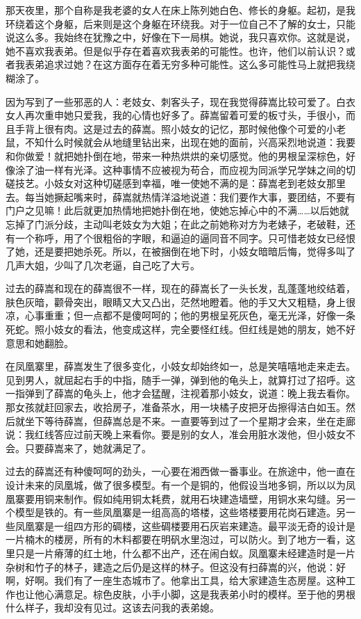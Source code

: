 那天夜里，那个自称是我老婆的女人在床上陈列她白色、修长的身躯。起初，是我环绕着这个身躯，后来则是这个身躯在环绕我。对于一位自己不了解的女士，只能说这么多。我始终在犹豫之中，好像在下一局棋。她说，我只喜欢你。这就是说，她不喜欢我表弟。但是似乎存在着喜欢我表弟的可能性。也许，他们以前认识？或者我表弟追求过她？在这方面存在着无穷多种可能性。这么多可能性马上就把我绕糊涂了。 

因为写到了一些邪恶的人：老妓女、刺客头子，现在我觉得薛嵩比较可爱了。白衣女人再次重申她只爱我，我的心情也好多了。薛嵩留着可爱的板寸头，手很小，而且手背上很有肉。这是过去的薛嵩。照小妓女的记忆，那时候他像个可爱的小老鼠，不知什么时候就会从地缝里钻出来，出现在她的面前，兴高采烈地说道：我要和你做爱！就把她扑倒在地，带来一种热烘烘的亲切感觉。他的男根呈深棕色，好像涂了油一样有光泽。这种事情不应被视为苟合，而应视为同派学兄学妹之间的切磋技艺。小妓女对这种切磋感到幸福，唯一使她不满的是：薛嵩老到老妓女那里去。每当她撅起嘴来时，薛嵩就热情洋溢地说道：我们要作大事，要团结，不要有门户之见嘛！此后就更加热情地把她扑倒在地，使她忘掉心中的不满……以后她就忘掉了门派分歧，主动叫老妓女为大姐；在此之前她称对方为老婊子，老破鞋，还有一个称呼，用了个很粗俗的字眼，和逼迫的逼同音不同字。只可惜老妓女已经恨了她，还是要把她杀死。所以，在被捆倒在地下时，小妓女暗暗后悔，觉得多叫了几声大姐，少叫了几次老逼，自己吃了大亏。 

过去的薛嵩和现在的薛嵩很不一样，现在的薛嵩长了一头长发，乱蓬蓬地绞结着，肤色灰暗，颧骨突出，眼睛又大又凸出，茫然地瞪着。他的手又大又粗糙，身上很凉，心事重重；但一点都不是傻呵呵的；他的男根呈死灰色，毫无光泽，好像一条死蛇。照小妓女的看法，他变成这样，完全要怪红线。但红线是她的朋友，她不好意思和她翻脸。 

在凤凰寨里，薛嵩发生了很多变化，小妓女却始终如一，总是笑嘻嘻地走来走去。见到男人，就屈起右手的中指，随手一弹，弹到他的龟头上，就算打过了招呼。这一指弹到了薛嵩的龟头上，他才会猛醒，注视着那小妓女，说道：晚上我去看你。那女孩就赶回家去，收拾房子，准备茶水，用一块橘子皮把牙齿擦得洁白如玉。然后就坐下等待薛嵩，但薛嵩总是不来。一直要等到过了一个星期才会来，坐在走廊说：我红线答应过前天晚上来看你。要是别的女人，准会用脏水泼他，但小妓女不会。只要薛嵩来了，她就满足了。 

过去的薛嵩还有种傻呵呵的劲头，一心要在湘西做一番事业。在旅途中，他一直在设计未来的凤凰城，做了很多模型。有一个是铜的，他假设当地多铜，所以以为凤凰寨要用铜来制作。假如纯用铜太耗费，就用石块建造墙壁，用铜水来勾缝。另一个模型是铁的。有一些凤凰寨是一组高高的塔楼，这些塔楼要用花岗石建造。另一些凤凰寨是一组四方形的碉楼，这些碉楼要用石灰岩来建造。最平淡无奇的设计是一片楠木的楼房，所有的木料都要在明矾水里泡过，可以防火。到了地方一看，这里只是一片瘠薄的红土地，什么都不出产，还在闹白蚁。凤凰寨未经建造时是一片杂树和竹子的林子，建造之后仍是这样的林子。但这没有扫薛嵩的兴，他说：好啊，好啊。我们有了一座生态城市了。他拿出工具，给大家建造生态房屋。这种工作也让他心满意足。棕色皮肤，小手小脚，这是我表弟小时的模样。至于他的男根什么样子，我却没有见过。这该去问我的表弟媳。 

